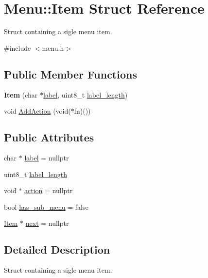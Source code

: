 \hypertarget{struct_menu_1_1_item}{}\section{Menu\+:\+:Item Struct Reference}
\label{struct_menu_1_1_item}


Struct containing a sigle menu item.  




{\ttfamily \#include $<$menu.\+h$>$}

\subsection*{Public Member Functions}
\begin{DoxyCompactItemize}
\item 
\hypertarget{struct_menu_1_1_item_ad87fb2f4d51e4c095b93af5ea4bd2275}{}\label{struct_menu_1_1_item_ad87fb2f4d51e4c095b93af5ea4bd2275} 
{\bfseries Item} (char $\ast$\hyperlink{struct_menu_1_1_item_a378723382fc64c752a85ffe6fec9707e}{label}, uint8\+\_\+t \hyperlink{struct_menu_1_1_item_a46749d046bbbde8d5308848d5394c2dc}{label\+\_\+length})
\item 
void \hyperlink{struct_menu_1_1_item_a9ae75532a76e0fdf4e9c22727280f029}{Add\+Action} (void($\ast$fn)())
\end{DoxyCompactItemize}
\subsection*{Public Attributes}
\begin{DoxyCompactItemize}
\item 
char $\ast$ \hyperlink{struct_menu_1_1_item_a378723382fc64c752a85ffe6fec9707e}{label} = nullptr
\item 
uint8\+\_\+t \hyperlink{struct_menu_1_1_item_a46749d046bbbde8d5308848d5394c2dc}{label\+\_\+length}
\item 
void $\ast$ \hyperlink{struct_menu_1_1_item_a247e140fed2addf80986ba5a3506b9dd}{action} = nullptr
\item 
bool \hyperlink{struct_menu_1_1_item_a5c9895a137458b9a12dafd447ac7430b}{has\+\_\+sub\+\_\+menu} = false
\item 
\hyperlink{struct_menu_1_1_item}{Item} $\ast$ \hyperlink{struct_menu_1_1_item_aadcc1e4e824296c6b72ac7d053f06869}{next} = nullptr
\end{DoxyCompactItemize}


\subsection{Detailed Description}
Struct containing a sigle menu item. 

